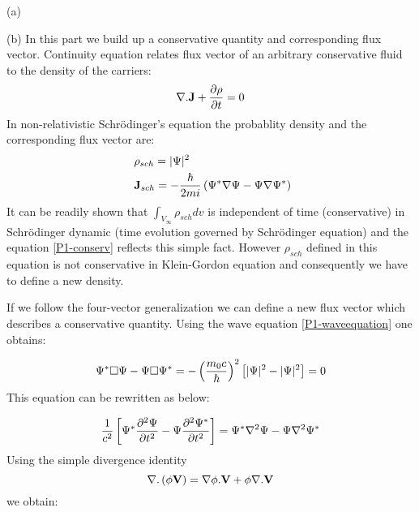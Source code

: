 \begin{homeworkProblem}
\begin{homeworkSection}{(a)}
\end{homeworkSection}
\begin{homeworkSection}{(b)}
In this part we build up a conservative quantity and corresponding flux vector. Continuity equation relates flux vector of an arbitrary conservative fluid to the density of the carriers:
\begin{equation}\label{P1-flux}
\nabla.\mathbf{J}+\frac{\partial \rho}{\partial t}=0
\end{equation} 
In non-relativistic Schr\"odinger's equation the probablity density and the corresponding flux vector are:
\begin{align}
&\rho_{sch}=\lvert\Psi\rvert^2\\\
&\mathbf{J}_{sch}=-\frac{\hbar}{2mi}\left(\Psi^*\nabla\Psi-\Psi\nabla\Psi^*\right)\label{P1-conserv}
\end{align}
It can be readily shown that $\int_{V_{\infty}}\rho_{sch}dv$ is independent of time (conservative) in  Schr\"odinger dynamic (time evolution governed by Schr\"odinger equation) and the equation \eqref{P1-conserv} reflects this simple fact. However $\rho_{sch}$ defined in this equation is not conservative in Klein-Gordon equation and consequently we have to define a new density. 

If we follow the four-vector generalization we can define a new flux vector which describes a conservative quantity. Using the wave equation \eqref{P1-waveequation} one obtains:

\begin{equation}
\Psi^*\Box\Psi-\Psi\Box\Psi^*=-\left(\frac{m_0c}{\hbar}\right)^2\left[\lvert\Psi\rvert^2-\lvert\Psi\rvert^2\right]=0
\end{equation}
This equation can be rewritten as below:

\begin{equation}
\frac{1}{c^2}\left[\Psi^*\dfrac{\partial^2 {\Psi}}{\partial {t}^2}-\Psi\dfrac{\partial^2 {\Psi^*}}{\partial {t}^2}\right]=\Psi^*\nabla^2\Psi-\Psi\nabla^2\Psi^*
\end{equation}
Using the simple divergence identity $$\nabla.\left(\phi\mathbf{V}\right)=\nabla\phi.\mathbf{V}+\phi\nabla.\mathbf{V}$$
we obtain:


\end{homeworkSection}
\end{homeworkProblem}
